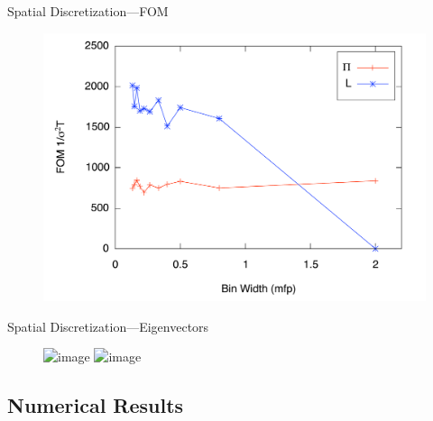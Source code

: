 \documentclass[xcolor={usenames, dvipsnames},]{beamer}
\begin{document}
\begin{frame}{Spatial Discretization---FOM}
    \begin{figure}\centering
        \includegraphics[width=.90\textwidth,keepaspectratio]{Figures/ErrorFOM}
    \end{figure}
\end{frame}

\begin{frame}{Spatial Discretization---Eigenvectors}
    \begin{figure}
        \includegraphics<1>[width=0.9\textwidth,keepaspectratio]{Figures/LinearVectors}
        \includegraphics<2>[width=0.9\textwidth,keepaspectratio]{Figures/HistoLinearVectors}
    \end{figure}
\end{frame}

\subsection{Numerical Results}
\end{document}
